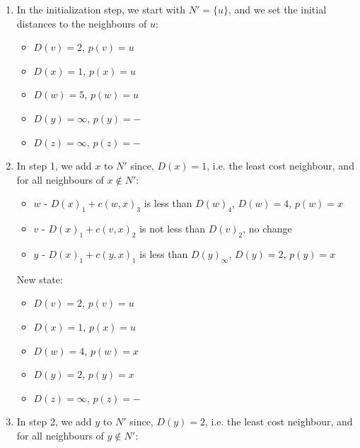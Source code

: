 \documentclass[12pt letter]{report}
\begin{document}
{  \begin{enumerate}
    \item In the initialization step, we start with $N' = \{u\}$, and
      we set the initial distances to the neighbours of $u$:
      \begin{itemize}
        \item $D(v) = 2$, $p(v) = u$
        \item $D(x) = 1$, $p(x) = u$
        \item $D(w) = 5$, $p(w) = u$
        \item $D(y) = \infty$, $p(y) = -$
        \item $D(z) = \infty$, $p(z) = -$
      \end{itemize}
    \item In step 1, we add $x$ to $N'$ since, $D\left( x \right) =
      1$, i.e. the least cost neighbour, and  for all neighbours of
      $x \not\in  N'$:
      \begin{itemize}
        \item $w$ -  $D\left(x\right)_{1} + c \left( w, x \right)_{3}$ is
          less than $D\left( w \right)_{4} $, $D \left( w \right) = 4
          $, $p \left( w \right) = x $
        \item $v$ - $D\left( x \right)_1 + c \left( v, x \right)_2  $
          is not less than $D \left( v \right)_2 $, no change
        \item $y$ - $D \left( x \right)_1 + c \left( y, x \right)_1
          $ is less than $D \left( y \right)_{\infty} $, $D \left( y
          \right) = 2 $, $p \left( y \right) = x $
      \end{itemize}
      New state:
      \begin{itemize}
        \item $D(v) = 2$, $p(v) = u$
        \item $D(x) = 1$, $p(x) = u$
        \item $D(w) = 4$, $p(w) = x$
        \item $D(y) = 2$, $p(y) = x$
        \item $D(z) = \infty$, $p(z) = -$
      \end{itemize}
    \item In step 2, we add $y$ to $N'$ since, $D \left( y \right) =
      2 $, i.e. the least cost neighbour, and for all neighbours of
      $y \not\in N'$:
\end{enumerate}}
\end{document}
